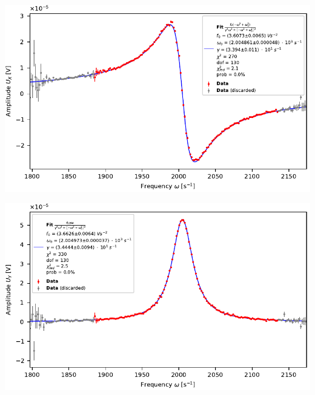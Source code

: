 \begin{center}
\begin{adjustbox}{max width=0.45\linewidth, keepaspectratio}
        \end{adjustbox}
        \begin{adjustbox}{max width=0.45\linewidth, keepaspectratio}
            \includegraphics[]{pdf/U_X_0_0}
        \end{adjustbox}
        \begin{adjustbox}{max width=0.45\linewidth, keepaspectratio}
            \includegraphics[]{pdf/U_Y_0_0}
        \end{adjustbox}
        \label{fig:RaumtempKomplett}
    \end{center}
\endminipage

